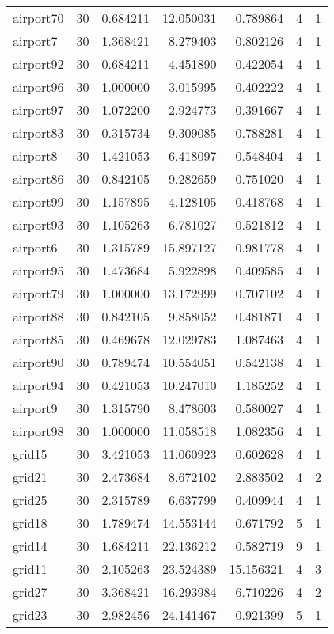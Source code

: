 \begin{longtable}{|l|r|r|r|r|r|r|}
airport70 & 30 & 0.684211 & 12.050031 & 0.789864 & 4 & 1 \\
airport7 & 30 & 1.368421 & 8.279403 & 0.802126 & 4 & 1 \\
airport92 & 30 & 0.684211 & 4.451890 & 0.422054 & 4 & 1 \\
airport96 & 30 & 1.000000 & 3.015995 & 0.402222 & 4 & 1 \\
airport97 & 30 & 1.072200 & 2.924773 & 0.391667 & 4 & 1 \\
airport83 & 30 & 0.315734 & 9.309085 & 0.788281 & 4 & 1 \\
airport8 & 30 & 1.421053 & 6.418097 & 0.548404 & 4 & 1 \\
airport86 & 30 & 0.842105 & 9.282659 & 0.751020 & 4 & 1 \\
airport99 & 30 & 1.157895 & 4.128105 & 0.418768 & 4 & 1 \\
airport93 & 30 & 1.105263 & 6.781027 & 0.521812 & 4 & 1 \\
airport6 & 30 & 1.315789 & 15.897127 & 0.981778 & 4 & 1 \\
airport95 & 30 & 1.473684 & 5.922898 & 0.409585 & 4 & 1 \\
airport79 & 30 & 1.000000 & 13.172999 & 0.707102 & 4 & 1 \\
airport88 & 30 & 0.842105 & 9.858052 & 0.481871 & 4 & 1 \\
airport85 & 30 & 0.469678 & 12.029783 & 1.087463 & 4 & 1 \\
airport90 & 30 & 0.789474 & 10.554051 & 0.542138 & 4 & 1 \\
airport94 & 30 & 0.421053 & 10.247010 & 1.185252 & 4 & 1 \\
airport9 & 30 & 1.315790 & 8.478603 & 0.580027 & 4 & 1 \\
airport98 & 30 & 1.000000 & 11.058518 & 1.082356 & 4 & 1 \\
grid15 & 30 & 3.421053 & 11.060923 & 0.602628 & 4 & 1 \\
grid21 & 30 & 2.473684 & 8.672102 & 2.883502 & 4 & 2 \\
grid25 & 30 & 2.315789 & 6.637799 & 0.409944 & 4 & 1 \\
grid18 & 30 & 1.789474 & 14.553144 & 0.671792 & 5 & 1 \\
grid14 & 30 & 1.684211 & 22.136212 & 0.582719 & 9 & 1 \\
grid11 & 30 & 2.105263 & 23.524389 & 15.156321 & 4 & 3 \\
grid27 & 30 & 3.368421 & 16.293984 & 6.710226 & 4 & 2 \\
grid23 & 30 & 2.982456 & 24.141467 & 0.921399 & 5 & 1 \\

\end{longtable}

